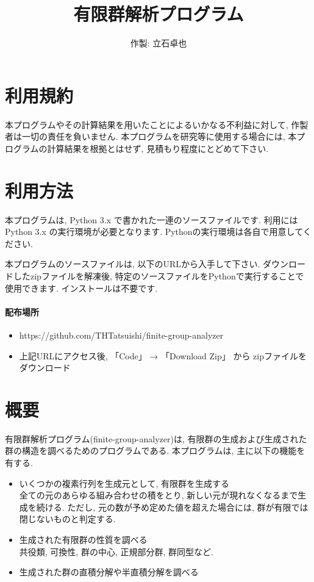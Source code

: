 \documentclass[11pt, a4paper]{jsarticle}
\title{
有限群解析プログラム
}
\author{
作製: 立石卓也
}
\begin{document}
\maketitle
\section{利用規約}
本プログラムやその計算結果を用いたことによるいかなる不利益に対して, 作製者は一切の責任を負いません.
本プログラムを研究等に使用する場合には, 本プログラムの計算結果を根拠とはせず, 見積もり程度にとどめて下さい.

\section{利用方法}
本プログラムは, Python 3.x で書かれた一連のソースファイルです.
利用にはPython 3.x の実行環境が必要となります.
Pythonの実行環境は各自で用意してください.

本プログラムのソースファイルは, 以下のURLから入手して下さい.
ダウンロードしたzipファイルを解凍後, 特定のソースファイルをPythonで実行することで使用できます.
インストールは不要です.

\paragraph{配布場所}
\begin{itemize}
\item https://github.com/THTatsuishi/finite-group-analyzer
\item 上記URLにアクセス後, 「Code」 → 「Download Zip」 から zipファイルをダウンロード
\end{itemize}

\section{概要}
有限群解析プログラム(finite-group-analyzer)は, 有限群の生成および生成された群の構造を調べるためのプログラムである.
本プログラムは, 主に以下の機能を有する.
\begin{itemize}
\item いくつかの複素行列を生成元として, 有限群を生成する\\
全ての元のあらゆる組み合わせの積をとり, 新しい元が現れなくなるまで生成を続ける.
ただし, 元の数が予め定めた値を超えた場合には, 群が有限では閉じないものと判定する.
\item 生成された有限群の性質を調べる\\
共役類, 可換性, 群の中心, 正規部分群, 群同型など.
\item 生成された群の直積分解や半直積分解を調べる
\end{itemize}
\end{document}
